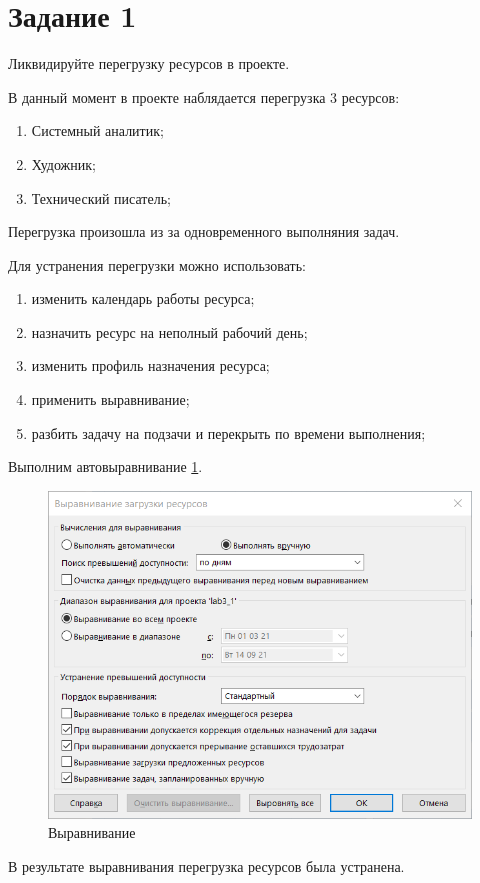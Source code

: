 \section{Задание 1}

Ликвидируйте перегрузку ресурсов в проекте.

В данный момент в проекте наблядается перегрузка 3 ресурсов:
\begin{enumerate}
	\item Системный аналитик;
	\item Художник;
	\item Технический писатель;
\end{enumerate}

Перегрузка произошла из за одновременного выполняния задач.

Для устранения перегрузки можно использовать:
\begin{enumerate}
	\item изменить календарь работы ресурса;
	\item назначить ресурс на неполный рабочий день;
	\item изменить профиль назначения ресурса;
	\item применить выравнивание;
	\item разбить задачу на подзачи и перекрыть по времени выполнения;
\end{enumerate}

Выполним автовыравнивание \ref{fig:lab311}.
\begin{figure}[H]
	\centering
	\includegraphics[width=0.7\linewidth]{src/lab3_1_1}
	\caption{Выравнивание}
	\label{fig:lab311}
\end{figure}

В результате выравнивания перегрузка ресурсов была устранена.










